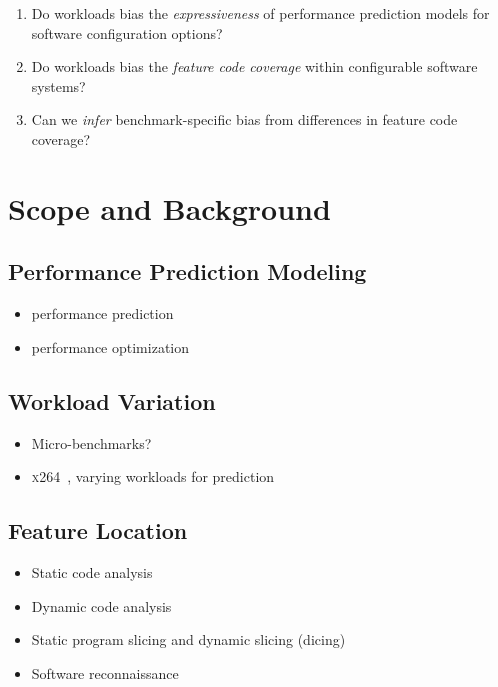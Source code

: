 \documentclass[conference]{IEEEtran}
\begin{document}
\begin{enumerate}
	\item Do workloads bias the \emph{expressiveness} of performance prediction models for software configuration options?
	\item Do workloads bias the \emph{feature code coverage} within configurable software systems?
	\item Can we \emph{infer} benchmark-specific bias from differences in feature code coverage?
\end{enumerate}


\section{Scope and Background}

\subsection{Performance Prediction Modeling}
\begin{itemize}
	\item performance prediction\cite{siegmund_performance-influence_2015,haDeepPerf2019,guo__2013,guo_2018_data,sarkarCostEfficientSamplingPerformance}
	\item performance optimization~\cite{nairUsingBadLearners2017,nairFlash18,ohFindingNearoptimalConfigurations2017}
\end{itemize}
\subsection{Workload Variation}
\begin{itemize}
	\item Micro-benchmarks?
	\item \textsc{x264}~\cite{alves_sampling_2020}, varying workloads for prediction~\cite{liao_2020_using_emse}
\end{itemize}
\subsection{Feature Location}
\begin{itemize}
	\item Static code analysis\cite{velez_2020_configcrusher_jase,lillack_2018_lotrack_tse,luo_2019_cova}
	\item Dynamic code analysis \cite{bell_phosphor_2014,velez_comprex_2021}
	\item Static program slicing and dynamic slicing (dicing)
	\item Software reconnaissance ~\cite{wong_integrated_2005,wilde_early_1996,agrawal_fault_1995,simmons_industrial_2006,chen_dynamic_nodate,sherwood_reducing_nodate}
\end{itemize}
\end{document}
